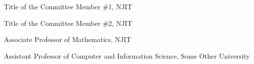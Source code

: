 




       {Title of the Committee Member \#1, NJIT}

       {Title of the Committee Member \#2, NJIT}
	
       {Associate Professor of Mathematics, NJIT}
	
       {Assistant Professor of Computer and Information Science, Some Other University}
